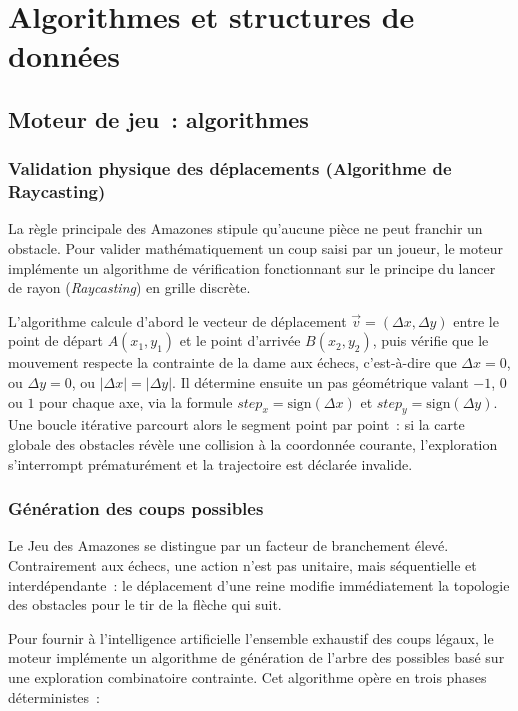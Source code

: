\documentclass[a4paper]{article}
\begin{document}
\section{Algorithmes et structures de données}

\subsection{Moteur de jeu~: algorithmes}
\label{sec:engine-algo}

\subsubsection{Validation physique des déplacements (Algorithme de Raycasting)}

La règle principale des Amazones stipule qu'aucune pièce ne peut franchir
un obstacle. Pour valider mathématiquement un coup saisi par un joueur,
le moteur implémente un algorithme de vérification fonctionnant sur
le principe du lancer de rayon (\textit{Raycasting}) en grille discrète.

L'algorithme calcule d'abord le vecteur de déplacement $\vec{v} = (\Delta x, \Delta y)$
entre le point de départ $A(x_1, y_1)$ et le point d'arrivée $B(x_2, y_2)$,
puis vérifie que le mouvement respecte la contrainte de la dame aux échecs,
c'est-à-dire que $\Delta x = 0$, ou $\Delta y = 0$, ou $|\Delta x| = |\Delta y|$.
Il détermine ensuite un pas géométrique valant $-1$, $0$ ou $1$ pour chaque
axe, via la formule $step_x = \text{sign}(\Delta x)$ et
$step_y = \text{sign}(\Delta y)$. Une boucle itérative parcourt alors le
segment point par point~: si la carte globale des obstacles révèle une 
collision à la coordonnée courante, l'exploration s'interrompt prématurément et la trajectoire est déclarée invalide.

\subsubsection{Génération des coups possibles}
Le Jeu des Amazones se distingue par un facteur de branchement élevé. Contrairement aux échecs, une action n'est pas unitaire, mais séquentielle et interdépendante~: le déplacement d'une reine modifie immédiatement la topologie des obstacles pour le tir de la flèche qui suit. 

Pour fournir à l'intelligence artificielle l'ensemble exhaustif des coups légaux, le moteur implémente un algorithme de génération de l'arbre des possibles basé sur une exploration combinatoire contrainte. Cet algorithme opère en trois phases déterministes~:
\end{document}
